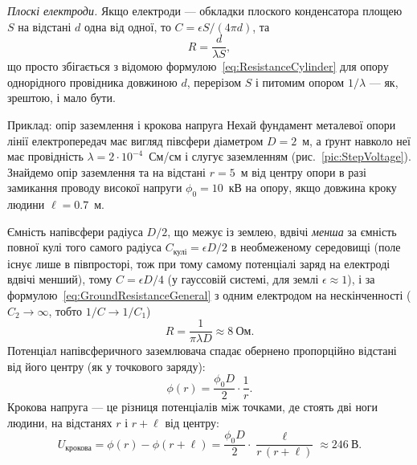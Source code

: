 \emph{Плоскі електроди.} Якщо електроди --- обкладки плоского конденсатора площею $S$ на відстані $d$ одна від одної, то $C = \epsilon S/(4\pi d)$, та
\begin{equation}\label{eq:GroundResistancePlates}
	R = \frac{d}{\lambda S},
\end{equation}
що просто збігається з відомою формулою~\eqref{eq:ResistanceCylinder} для опору однорідного провідника довжиною $d$, перерізом $S$ і питомим опором
$1/\lambda$ --- як, зрештою, і мало бути.

\begin{Example}{Приклад: опір заземлення і крокова напруга}
Нехай фундамент металевої опори лінії електропередач має вигляд півсфери діаметром $D=2$~м, а ґрунт навколо неї має провідність
$\lambda = 2\cdot10^{-4}$~См/см і слугує заземленням (рис.~\ref{pic:StepVoltage}). Знайдемо опір заземлення та  на відстані
$r=5$~м від центру опори в разі замикання проводу високої напруги $\phi_0=10$~кВ на опору, якщо довжина кроку людини $\ell=0.7$~м.

\begin{center}%
\end{center}

Ємність напівсфери радіуса $D/2$, що межує із землею, вдвічі \emph{менша} за ємність повної кулі того самого радіуса $C_{\text{кулі}}=\epsilon D/2$ в необмеженому середовищі (поле існує лише в півпросторі, тож при тому самому потенціалі заряд на електроді вдвічі менший), тому $C = \epsilon D/4$ (у гауссовій системі, для землі $\epsilon\approx 1$), і за
формулою~\eqref{eq:GroundResistanceGeneral} з одним електродом на нескінченності ($C_2\to\infty$, тобто $1/C \to 1/C_1$)
\begin{equation*}
	R = \frac{1}{\pi\lambda D} \approx 8\ \text{Ом}.
\end{equation*}
Потенціал напівсферичного заземлювача спадає обернено пропорційно відстані від його центру (як у точкового заряду):
\begin{equation*}
	\phi(r) = \frac{\phi_0 D}{2}\cdot\frac1r.
\end{equation*}
Крокова напруга --- це різниця потенціалів між точками, де стоять дві ноги людини, на відстанях $r$ і $r+\ell$ від центру:
\begin{equation*}
	U_\text{крокова} = \phi(r) - \phi(r+\ell) = \frac{\phi_0 D}{2}\cdot\frac{\ell}{r\,(r+\ell)} \approx 246\ \text{В}.
\end{equation*}
\end{Example}

